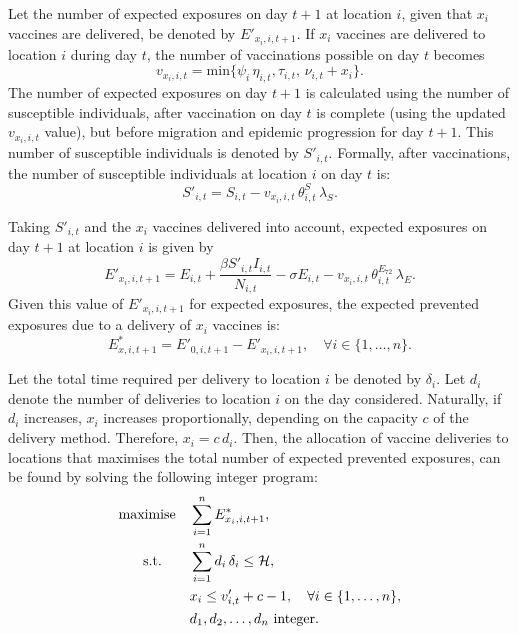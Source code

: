 Let the number of expected exposures on day $t+1$ at location $i$, given that $x_{i}$ vaccines are delivered, be denoted by $E'_{x_{i},i,t+1}$. If $x_{i}$ vaccines are delivered to location $i$ during day $t$, the number of vaccinations possible on day $t$ becomes $$v_{x_{i},i,t} = \text{min} \{\psi_{i} \,\eta_{i,t}, \tau_{i,t}, \, \nu_{i,t} + x_{i} \}.$$ 
The number of expected exposures on day $t+1$ is calculated using the number of susceptible individuals, after vaccination on day $t$ is complete (using the updated $v_{x_{i},i,t}$ value), but before migration and epidemic progression for day $t+1$. This number of susceptible individuals is denoted by $S'_{i,t}$. 
Formally, after vaccinations, the number of susceptible individuals at location $i$ on day $t$ is: $$S'_{i,t} = S_{i,t} - v_{x_{i},i,t} \, \theta^{S}_{i,t} \, \lambda_{S}.$$

Taking $S'_{i,t}$ and the $x_{i}$ vaccines delivered into account, expected exposures on day $t+1$ at location $i$ is given by 
$$E'_{x_{i},i,t+1} = E_{i,t} + \frac{\beta S'_{i,t} I_{i,t}}{N_{i,t}} - \sigma E_{i,t} - v_{x_{i},i,t} \, \theta^{E_{72}}_{i,t} \, \lambda_{E}.$$
Given this value of $E'_{x_{i},i,t+1}$ for expected exposures, the expected prevented exposures due to a delivery of $x_{i}$ vaccines is:
$$E^{*}_{x,i,t+1} = E'_{0,i,t+1} - E'_{x_{i},i,t+1}, \quad \forall{i} \in \{1, \dots, n \}.$$

Let the total time required per delivery to location $i$ be denoted by $\delta_{i}$. Let $d_{i}$ denote the number of deliveries to location $i$ on the day considered. Naturally, if $d_{i}$ increases, $x_{i}$ increases proportionally, depending on the capacity $c$ of the delivery method. Therefore, $x_{i} = c \, d_{i}$.
Then, the allocation of vaccine deliveries to locations that maximises the total number of expected prevented exposures, can be found by solving the following integer program:
\begin{align}
    \text{maximise\quad} & \sum_{i=1}^{n} E^{*}_{x_{i},i,t+1}, \\
    \text{s.t.\qquad} & \sum_{i=1}^{n} d_{i}\,\delta_{i} \leq \mathcal{H}, \\
    &x_{i} \leq v'_{i,t} + c - 1, \quad \forall{i} \in \{1, \dots,n \},\\
    &d_{1}, d_{2}, \ldots, d_{n} \text{ integer}.
\end{align}

